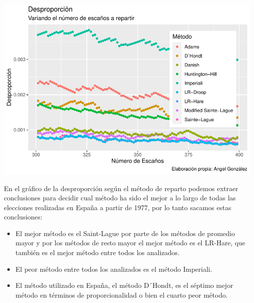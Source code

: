 \documentclass[12pt,a4paper,]{book}
\providecommand{\tightlist}{%
  \setlength{\itemsep}{0pt}\setlength{\parskip}{0pt}}
\numberwithin{dummy}{section}
\theoremstyle{ocrenumbox}
\theoremstyle{blacknumex}
\theoremstyle{blacknumbox}
\theoremstyle{ocrenum}
\theoremstyle{ocrenum}
\begin{document}
\begin{center}\includegraphics[width=1\linewidth]{figurasR/unnamed-chunk-50-1} \end{center}

En el gráfico de la desproporción según el método de reparto podemos
extraer conclusiones para decidir cual método ha sido el mejor a lo
largo de todas las elecciones realizadas en España a partir de 1977, por
lo tanto sacamos estas conclusiones:

\begin{itemize}
\tightlist
\item
  El mejor método es el Saint-Lague por parte de los métodos de promedio
  mayor y por los métodos de resto mayor el mejor método es el LR-Hare,
  que también es el mejor método entre todos los analizados.
\item
  El peor método entre todos los analizados es el método Imperiali.
\item
  El método utilizado en España, el método D´Hondt, es el séptimo mejor
  método en términos de proporcionalidad o bien el cuarto peor método.
\end{itemize}
\end{document}
